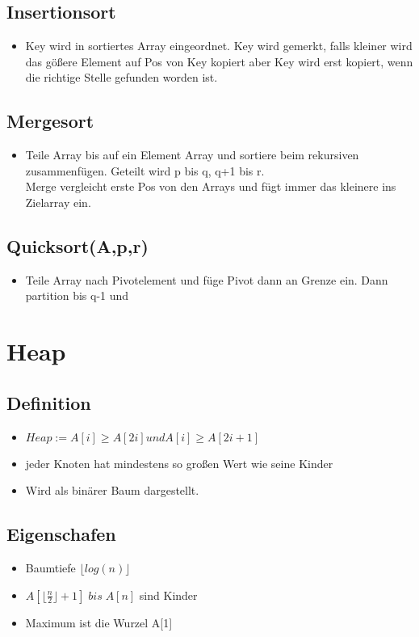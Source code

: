 \documentclass{article}
\begin{document}
\subsection{Insertionsort}
\begin{itemize}
\item Key wird in sortiertes Array eingeordnet. Key wird gemerkt, falls kleiner wird das g{\"o}\ss ere Element auf Pos von Key kopiert aber Key wird erst kopiert, wenn die richtige Stelle gefunden worden ist.
\end{itemize}

\subsection{Mergesort}
\begin{itemize}
\item Teile Array bis auf ein Element Array und sortiere beim rekursiven zusammenf{\"u}gen. Geteilt wird p bis q, q+1 bis r. \\
Merge vergleicht erste Pos von den Arrays und f{\"u}gt immer das kleinere ins Zielarray ein.

\end{itemize}

\subsection{Quicksort(A,p,r)}
\begin{itemize}
\item Teile Array nach Pivotelement und f{\"u}ge Pivot dann an Grenze ein. Dann partition bis q-1 und 
\end{itemize}

\section{Heap}
\subsection{Definition}

\begin{itemize}
\item $ Heap := A[i] \geq A[2i] und A[i] \geq A[2i+1]$ 
\item jeder Knoten hat mindestens so gro\ss en Wert wie seine Kinder 
\item Wird als bin{\"a}rer Baum dargestellt.
\end{itemize}

\subsection{Eigenschafen}
\begin{itemize}
\item Baumtiefe $\lfloor log(n)\rfloor$
\item $A[\lfloor \frac{n}{2} \rfloor +1] \; bis \; A[n]$ sind Kinder
\item Maximum ist die Wurzel A[1]
\end{itemize}
\end{document}
